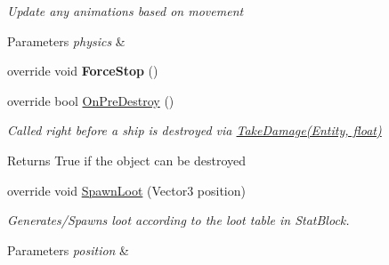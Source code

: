 \begin{DoxyCompactItemize}
\begin{DoxyCompactList}\small\item\em Update any animations based on movement 


\begin{DoxyParams}{Parameters}
{\em physics} & \\
\hline
\end{DoxyParams}
 \end{DoxyCompactList}\item 
\hypertarget{class_skyrates_1_1_entity_1_1_entity_player_ship_a2692a8bb63e6a3dc1583eb273a447db7}{override void {\bfseries Force\-Stop} ()}\label{class_skyrates_1_1_entity_1_1_entity_player_ship_a2692a8bb63e6a3dc1583eb273a447db7}

\item 
\hypertarget{class_skyrates_1_1_entity_1_1_entity_player_ship_a6c97060ca9e600928b56dc82cf351ac3}{override bool \hyperlink{class_skyrates_1_1_entity_1_1_entity_player_ship_a6c97060ca9e600928b56dc82cf351ac3}{On\-Pre\-Destroy} ()}\label{class_skyrates_1_1_entity_1_1_entity_player_ship_a6c97060ca9e600928b56dc82cf351ac3}

\begin{DoxyCompactList}\small\item\em Called right before a ship is destroyed via \hyperlink{class_skyrates_1_1_entity_1_1_entity_ship_a3ad30bc27cf8344c4acbfea78f8ee373}{Take\-Damage(\-Entity, float)} 

\begin{DoxyReturn}{Returns}
True if the object can be destroyed
\end{DoxyReturn}
 \end{DoxyCompactList}\item 
\hypertarget{class_skyrates_1_1_entity_1_1_entity_player_ship_aee94c642f363a28bd296b9255efe7039}{override void \hyperlink{class_skyrates_1_1_entity_1_1_entity_player_ship_aee94c642f363a28bd296b9255efe7039}{Spawn\-Loot} (Vector3 position)}\label{class_skyrates_1_1_entity_1_1_entity_player_ship_aee94c642f363a28bd296b9255efe7039}

\begin{DoxyCompactList}\small\item\em Generates/\-Spawns loot according to the loot table in Stat\-Block. 


\begin{DoxyParams}{Parameters}
{\em position} & \\
\hline
\end{DoxyParams}
 \end{DoxyCompactList}\end{DoxyCompactItemize}
